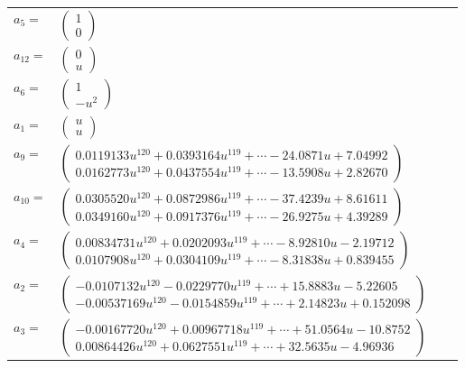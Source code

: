 \documentclass[1p]{elsarticle_modified}
\theoremstyle{definition}
\begin{document}
\begin{tabular}{m{7pt} m{180pt} m{7pt} m{180pt} }
\flushright $a_{5}=$&$\begin{pmatrix}1\\0\end{pmatrix}$ \\
\flushright $a_{12}=$&$\begin{pmatrix}0\\u\end{pmatrix}$ \\
\flushright $a_{6}=$&$\begin{pmatrix}1\\- u^2\end{pmatrix}$ \\
\flushright $a_{1}=$&$\begin{pmatrix}u\\u\end{pmatrix}$ \\
\flushright $a_{9}=$&$\begin{pmatrix}0.0119133 u^{120}+0.0393164 u^{119}+\cdots-24.0871 u+7.04992\\0.0162773 u^{120}+0.0437554 u^{119}+\cdots-13.5908 u+2.82670\end{pmatrix}$ \\
\flushright $a_{10}=$&$\begin{pmatrix}0.0305520 u^{120}+0.0872986 u^{119}+\cdots-37.4239 u+8.61611\\0.0349160 u^{120}+0.0917376 u^{119}+\cdots-26.9275 u+4.39289\end{pmatrix}$ \\
\flushright $a_{4}=$&$\begin{pmatrix}0.00834731 u^{120}+0.0202093 u^{119}+\cdots-8.92810 u-2.19712\\0.0107908 u^{120}+0.0304109 u^{119}+\cdots-8.31838 u+0.839455\end{pmatrix}$ \\
\flushright $a_{2}=$&$\begin{pmatrix}-0.0107132 u^{120}-0.0229770 u^{119}+\cdots+15.8883 u-5.22605\\-0.00537169 u^{120}-0.0154859 u^{119}+\cdots+2.14823 u+0.152098\end{pmatrix}$ \\
\flushright $a_{3}=$&$\begin{pmatrix}-0.00167720 u^{120}+0.00967718 u^{119}+\cdots+51.0564 u-10.8752\\0.00864426 u^{120}+0.0627551 u^{119}+\cdots+32.5635 u-4.96936\end{pmatrix}$ \\

\end{tabular}
\end{document}
